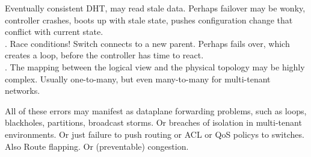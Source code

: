 
 Eventually consistent
DHT, may read stale data. Perhaps failover may be wonky, controller crashes,
boots up with stale state, pushes configuration change that conflict with
current state. \\
. Race conditions!
Switch connects to a new parent. Perhaps fails over, which creates a loop, 
before the controller has time to react. \\
. The mapping between the logical view and
the physical topology may be highly complex. Usually one-to-many, but even
many-to-many for multi-tenant networks. 

All of these errors may manifest as dataplane forwarding problems, such as
loops, blackholes, partitions, broadcast storms. Or breaches of isolation in
multi-tenant environments. Or just failure to push routing or ACL or QoS
policys to switches. Also Route flapping. Or (preventable) congestion.
